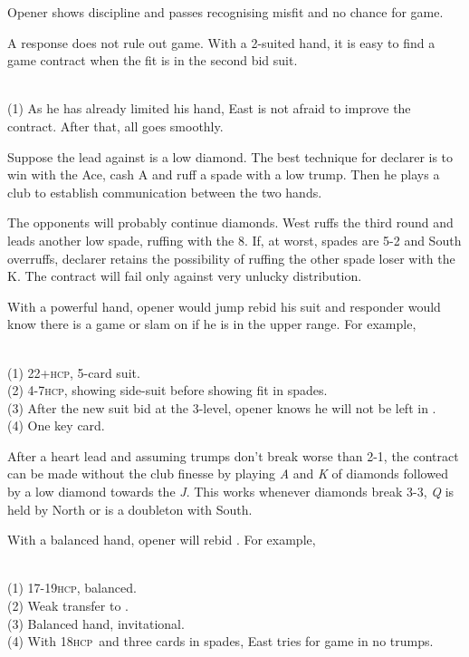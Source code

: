 \documentclass[a4paper,article,oneside]{memoir}
\newcommand{\gap}{\vspace{\baselineskip}}
\newcommand{\hcp}{\textsc{hcp}}
\begin{document}
Opener shows discipline and passes recognising misfit and no chance
for game.

\gap
A  response does not rule out game. With a 2-suited hand,
it is easy to find a game contract when the fit is in the second bid
suit.

 \\ (1) As he has already
limited his hand, East is not afraid to improve the contract. After
that, all goes smoothly.

Suppose the lead against  is a low diamond. The best technique
for declarer is to win with the Ace, cash \sp{}A and ruff a spade with
a low trump. Then he plays a club to establish communication between
the two hands.

The opponents will probably continue diamonds. West ruffs the third
round and leads another low spade, ruffing with the \he{}8. If, at
worst, spades are 5-2 and South overruffs, declarer retains the
possibility of ruffing the other spade loser with the \he{}K. The
contract will fail only against very unlucky distribution.

\gap
With a powerful hand, opener would jump rebid his suit and responder
would know there is a game or slam on if he is in the upper range. For
example,

 \\
(1) 22+\hcp, 5-card suit. \\ (2) 4-7\hcp, showing side-suit before
showing fit in spades. \\ (3) After the new suit bid at the 3-level,
opener knows he will not be left in . \\ (4) One key card.

After a heart lead and assuming trumps don't break worse than 2-1, the
contract can be made without the club finesse by playing \emph{A} and
\emph{K} of diamonds followed by a low diamond towards the
\emph{J}. This works whenever diamonds break 3-3, \di{}\emph{Q} is
held by North or is a doubleton with South.

\gap
With a balanced hand, opener will rebid \nt{}. For example,

 \\
(1) 17-19\hcp, balanced. \\ (2) Weak transfer to . \\ (3)
Balanced hand, invitational. \\ (4) With 18\hcp\ and three cards in
spades, East tries for game in no trumps.
\end{document}
